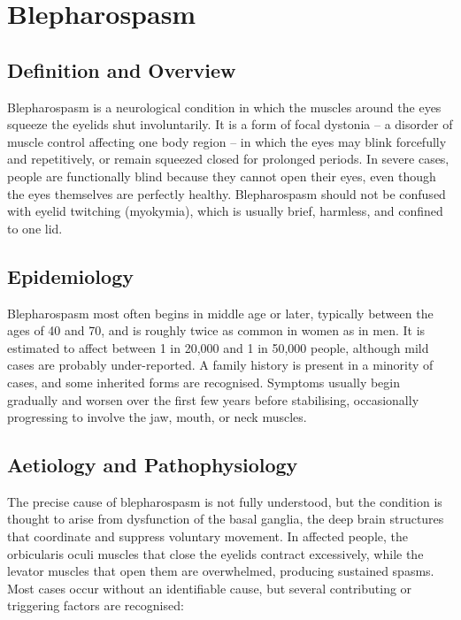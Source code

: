 \chapter{Blepharospasm}

\section*{Definition and Overview}
Blepharospasm is a neurological condition in which the muscles around the eyes squeeze the eyelids shut involuntarily. It is a form of focal dystonia -- a disorder of muscle control affecting one body region -- in which the eyes may blink forcefully and repetitively, or remain squeezed closed for prolonged periods. In severe cases, people are functionally blind because they cannot open their eyes, even though the eyes themselves are perfectly healthy. Blepharospasm should not be confused with eyelid twitching (myokymia), which is usually brief, harmless, and confined to one lid.

\section*{Epidemiology}
Blepharospasm most often begins in middle age or later, typically between the ages of 40 and 70, and is roughly twice as common in women as in men. It is estimated to affect between 1 in 20,000 and 1 in 50,000 people, although mild cases are probably under-reported. A family history is present in a minority of cases, and some inherited forms are recognised. Symptoms usually begin gradually and worsen over the first few years before stabilising, occasionally progressing to involve the jaw, mouth, or neck muscles.

\section*{Aetiology and Pathophysiology}
The precise cause of blepharospasm is not fully understood, but the condition is thought to arise from dysfunction of the basal ganglia, the deep brain structures that coordinate and suppress voluntary movement. In affected people, the orbicularis oculi muscles that close the eyelids contract excessively, while the levator muscles that open them are overwhelmed, producing sustained spasms. Most cases occur without an identifiable cause, but several contributing or triggering factors are recognised:

